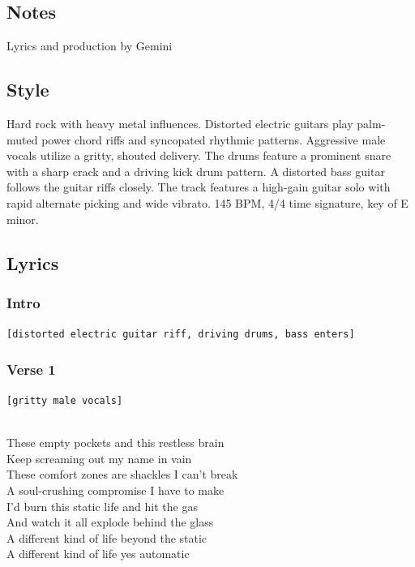 \documentclass[]{article}
\begin{document}
\subsection{Notes}\label{notes-6}

Lyrics and production by Gemini

\subsection{Style}\label{style-6}

Hard rock with heavy metal influences. Distorted electric guitars play
palm-muted power chord riffs and syncopated rhythmic patterns.
Aggressive male vocals utilize a gritty, shouted delivery. The drums
feature a prominent snare with a sharp crack and a driving kick drum
pattern. A distorted bass guitar follows the guitar riffs closely. The
track features a high-gain guitar solo with rapid alternate picking and
wide vibrato. 145 BPM, 4/4 time signature, key of E minor.

\subsection{Lyrics}\label{lyrics-6}

\subsubsection{Intro}\label{intro}

\texttt{{[}distorted\ electric\ guitar\ riff,\ driving\ drums,\ bass\ enters{]}}

\subsubsection{Verse 1}\label{verse-1-1}

\texttt{{[}gritty\ male\ vocals{]}}\strut \\
These empty pockets and this restless brain\\
Keep screaming out my name in vain\\
These comfort zones are shackles I can't break\\
A soul-crushing compromise I have to make\\
I'd burn this static life and hit the gas\\
And watch it all explode behind the glass\\
A different kind of life beyond the static\\
A different kind of life yes automatic
\end{document}
